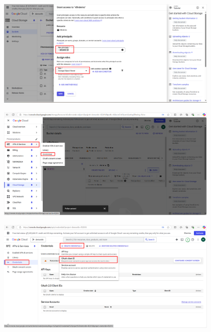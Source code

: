 \begin{itemize}[label=]
\begin{figure}[H]
    \end{figure}
    \begin{figure}[H]
    \centering
    \includegraphics[width=0.95\textwidth]{images/GGcloud-9.png}
    
    \end{figure}
    \begin{figure}[H]
    \centering
    \includegraphics[width=0.95\textwidth]{images/GGcloud-10.png}
    
    \end{figure}
        \begin{figure}[H]
    \centering
    \includegraphics[width=0.95\textwidth]{images/GGcloud-11.png}
    

\end{figure}
\end{itemize}
